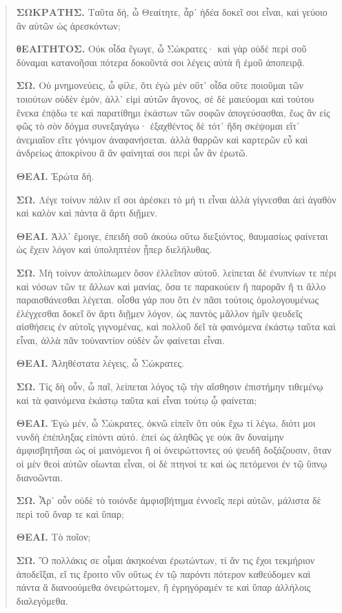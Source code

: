 \begin{quote}
{\g\textbf{ΣΩΚΡΑΤΗΣ.} Ταῦτα δή, ὦ Θεαίτητε, ἆρ᾽ ἡδέα δοκεῖ σοι εἶναι, καὶ γεύοιο ἂν αὐτῶν ὡς ἀρεσκόντων;

\textbf{θΕΑΊΤΗΤΟΣ.} Οὐκ οἶδα ἔγωγε, ὦ Σώκρατες· καὶ γὰρ οὐδὲ περὶ σοῦ δύναμαι κατανοῆσαι πότερα δοκοῦντά σοι λέγεις αὐτὰ ἢ ἐμοῦ ἀποπειρᾷ.

\textbf{ΣΩ.} Οὐ μνημονεύεις, ὦ φίλε, ὅτι ἐγὼ μὲν οὔτ᾽ οἶδα οὔτε ποιοῦμαι τῶν τοιούτων οὐδὲν ἐμόν, ἀλλ᾽ εἰμὶ αὐτῶν ἄγονος, σὲ δὲ μαιεύομαι καὶ τούτου ἕνεκα ἐπᾴδω τε καὶ παρατίθημι ἑκάστων τῶν σοφῶν ἀπογεύσασθαι, ἕως ἂν εἰς φῶς τὸ σὸν δόγμα συνεξαγάγω· ἐξαχθέντος δὲ τότ᾽ ἤδη σκέψομαι εἴτ᾽ ἀνεμιαῖον εἴτε γόνιμον ἀναφανήσεται. ἀλλὰ θαρρῶν καὶ καρτερῶν εὖ καὶ ἀνδρείως ἀποκρίνου ἃ ἂν φαίνηταί σοι περὶ ὧν ἂν ἐρωτῶ.

\textbf{ΘΕΑΙ.} Ἐρώτα δή.

\textbf{ΣΩ.} Λέγε τοίνυν πάλιν εἴ σοι ἀρέσκει τὸ μή τι εἶναι ἀλλὰ γίγνεσθαι ἀεὶ ἀγαθὸν καὶ καλὸν καὶ πάντα ἃ ἄρτι διῇμεν.

\textbf{ΘΕΑΙ.} Ἀλλ᾽ ἔμοιγε, ἐπειδὴ σοῦ ἀκούω οὕτω διεξιόντος, θαυμασίως φαίνεται ὡς ἔχειν λόγον καὶ ὑποληπτέον ᾗπερ διελήλυθας.

\textbf{ΣΩ.} Μὴ τοίνυν ἀπολίπωμεν ὅσον ἐλλεῖπον αὐτοῦ. λείπεται δὲ ἐνυπνίων τε πέρι καὶ νόσων τῶν τε ἄλλων καὶ μανίας, ὅσα τε παρακούειν ἢ παρορᾶν ἤ τι ἄλλο παραισθάνεσθαι λέγεται. οἶσθα γάρ που ὅτι ἐν πᾶσι τούτοις ὁμολογουμένως ἐλέγχεσθαι δοκεῖ ὃν ἄρτι διῇμεν λόγον, ὡς παντὸς μᾶλλον ἡμῖν ψευδεῖς αἰσθήσεις ἐν αὐτοῖς γιγνομένας, καὶ πολλοῦ δεῖ τὰ φαινόμενα ἑκάστῳ ταῦτα καὶ εἶναι, ἀλλὰ πᾶν τοὐναντίον οὐδὲν ὧν φαίνεται εἶναι.

\textbf{ΘΕΑΙ.} Ἀληθέστατα λέγεις, ὦ Σώκρατες.

\textbf{ΣΩ.} Τίς δὴ οὖν, ὦ παῖ, λείπεται λόγος τῷ τὴν αἴσθησιν ἐπιστήμην τιθεμένῳ καὶ τὰ φαινόμενα ἑκάστῳ ταῦτα καὶ εἶναι τούτῳ ᾧ φαίνεται;

\textbf{ΘΕΑΙ.} Ἐγὼ μέν, ὦ Σώκρατες, ὀκνῶ εἰπεῖν ὅτι οὐκ ἔχω τί λέγω, διότι μοι νυνδὴ ἐπέπληξας εἰπόντι αὐτό. ἐπεὶ ὡς ἀληθῶς γε οὐκ ἂν δυναίμην ἀμφισβητῆσαι ὡς οἱ μαινόμενοι ἢ οἱ ὀνειρώττοντες οὐ ψευδῆ δοξάζουσιν, ὅταν οἱ μὲν θεοὶ αὐτῶν οἴωνται εἶναι, οἱ δὲ πτηνοί τε καὶ ὡς πετόμενοι ἐν τῷ ὕπνῳ διανοῶνται.

\textbf{ΣΩ.} Ἆρ᾽ οὖν οὐδὲ τὸ τοιόνδε ἀμφισβήτημα ἐννοεῖς περὶ αὐτῶν, μάλιστα δὲ περὶ τοῦ ὄναρ τε καὶ ὕπαρ;

\textbf{ΘΕΑΙ.} Τὸ ποῖον;

\textbf{ΣΩ.} Ὃ πολλάκις σε οἶμαι ἀκηκοέναι ἐρωτώντων, τί ἄν τις ἔχοι τεκμήριον ἀποδεῖξαι, εἴ τις ἔροιτο νῦν οὕτως ἐν τῷ παρόντι πότερον καθεύδομεν καὶ πάντα ἃ διανοούμεθα ὀνειρώττομεν, ἢ ἐγρηγόραμέν τε καὶ ὕπαρ ἀλλήλοις διαλεγόμεθα.

}
\end{quote}
